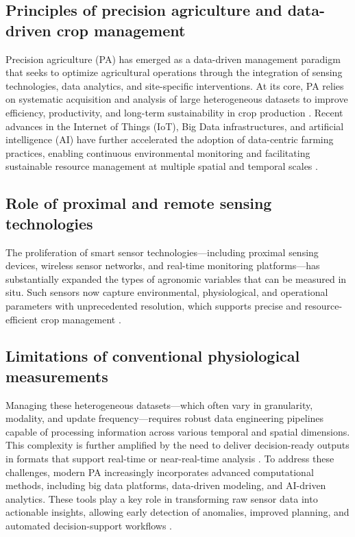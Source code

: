 \subsection{Principles of precision agriculture and data-driven crop management}

\noindent
Precision agriculture (PA) has emerged as a data-driven management paradigm that seeks to optimize agricultural operations through the integration of sensing technologies, data analytics, and site-specific interventions. At its core, PA relies on systematic acquisition and analysis of large heterogeneous datasets to improve efficiency, productivity, and long-term sustainability in crop production \cite{mgendi2024unlocking}. Recent advances in the Internet of Things (IoT), Big Data infrastructures, and artificial intelligence (AI) have further accelerated the adoption of data-centric farming practices, enabling continuous environmental monitoring and facilitating sustainable resource management at multiple spatial and temporal scales \cite{AHMED2025100848}.

\subsection{Role of proximal and remote sensing technologies}

\noindent
The proliferation of smart sensor technologies—including proximal sensing devices, wireless sensor networks, and real-time monitoring platforms—has substantially expanded the types of agronomic variables that can be measured in situ. Such sensors now capture environmental, physiological, and operational parameters with unprecedented resolution, which supports precise and resource-efficient crop management \cite{soussi2024smart}.

\subsection{Limitations of conventional physiological measurements}

\noindent
Managing these heterogeneous datasets—which often vary in granularity, modality, and update frequency—requires robust data engineering pipelines capable of processing information across various temporal and spatial dimensions. This complexity is further amplified by the need to deliver decision-ready outputs in formats that support real-time or near-real-time analysis \cite{krisnawijaya2022data}. To address these challenges, modern PA increasingly incorporates advanced computational methods, including big data platforms, data-driven modeling, and AI-driven analytics. These tools play a key role in transforming raw sensor data into actionable insights, allowing early detection of anomalies, improved planning, and automated decision-support workflows \cite{mgendi2024unlocking, AHMED2025100848}.

